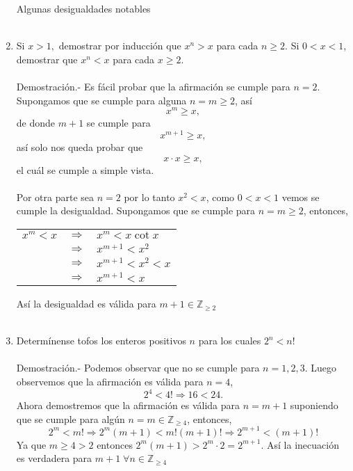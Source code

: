 \begin{enumerate}
Algunas desigualdades notables\\\\
\item Si $x>1,$ demostrar por inducción que $x^n >x$ para cada $n\geq 2.$ Si $0<x<1$, demostrar que $x^n<x$ para cada $x \geq 2.$\\\\
Demostración.- \; Es fácil probar que la afirmación se cumple para $n=2$. Supongamos que se cumple para alguna $n=m \geq 2$, así $$x^m \geq x,$$ de donde $m+1$ se cumple para $$x^{m+1}\geq x,$$ así solo nos queda probar que $$x \cdot x \geq x,$$ el cuál se cumple a simple vista.\\\\
Por otra parte sea $n=2$ por lo tanto $x^2<x$, como $0<x<1$ vemos se cumple la desigualdad. Supongamos que se cumple para $n=m \geq 2$, entonces,
\begin{center}
\begin{tabular}{rcl}
$x^m<x$&$\Rightarrow$&$x^m < x\cot x$\\
&$\Rightarrow$&$x^{m+1}<x^2$\\
&$\Rightarrow$&$x^{m+1}<x^2<x$\\
&$\Rightarrow$&$x^{m+1}<x$\\
\end{tabular}
\end{center}
Así la desigualdad es válida para $m+1 \in \mathbb{Z}_{\geq 2}$\\\\


\item Determínense tofos los enteros positivos $n$ para los cuales $2^n < n!$\\\\
Demostración.- \; Podemos observar que no se cumple para $n=1,2,3$. Luego observemos que la afirmación es válida para $n=4$,   $$2^4 < 4! \Rightarrow 16<24.$$
Ahora demostremos que la afirmación es válida para $n=m+1$ suponiendo que se cumple para algún $n=m \in \mathbb{Z}_{\geq 4}$, entonces,
$$2^m < m! \Longrightarrow 2^{m} (m+1) < m! (m+1)! \Longrightarrow 2^{m+1} < (m+1)! $$
Ya que $m\geq 4 > 2$ entonces $2^m(m+1) > 2^m \cdot 2 = 2^{m+1}$. Así la inecuación es verdadera para $m+1 \; \forall n \in \mathbb{Z}_{\geq 4}$\\\\


\end{enumerate}
